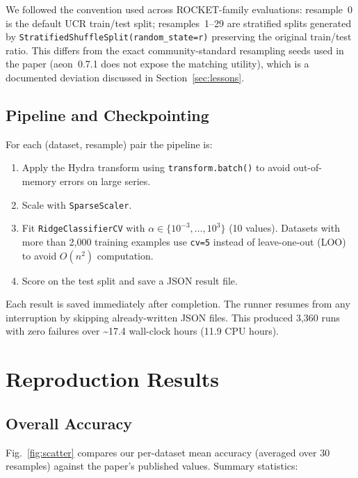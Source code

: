 \documentclass[conference]{IEEEtran}
\begin{document}
We followed the convention used across ROCKET-family evaluations: resample~0
is the default UCR train/test split; resamples~1--29 are stratified splits
generated by \texttt{StratifiedShuffleSplit(random\_state=r)} preserving
the original train/test ratio. This differs from the exact community-standard
resampling seeds used in the paper (aeon~0.7.1 does not expose the matching
utility), which is a documented deviation discussed in Section~\ref{sec:lessons}.

\subsection{Pipeline and Checkpointing}

For each (dataset, resample) pair the pipeline is:
\begin{enumerate}
  \item Apply the Hydra transform using \texttt{transform.batch()} to
        avoid out-of-memory errors on large series.
  \item Scale with \texttt{SparseScaler}.
  \item Fit \texttt{RidgeClassifierCV} with $\alpha \in \{10^{-3},\ldots,10^3\}$
        (10 values). Datasets with more than 2,000 training examples use
        \texttt{cv=5} instead of leave-one-out (LOO) to avoid $O(n^2)$
        computation.
  \item Score on the test split and save a JSON result file.
\end{enumerate}

Each result is saved immediately after completion. The runner resumes from
any interruption by skipping already-written JSON files. This produced
3,360 runs with zero failures over \textasciitilde{}17.4 wall-clock hours
(11.9 CPU hours).

\section{Reproduction Results}

\subsection{Overall Accuracy}

Fig.~\ref{fig:scatter} compares our per-dataset mean accuracy (averaged
over 30 resamples) against the paper's published values. Summary statistics:
\end{document}
